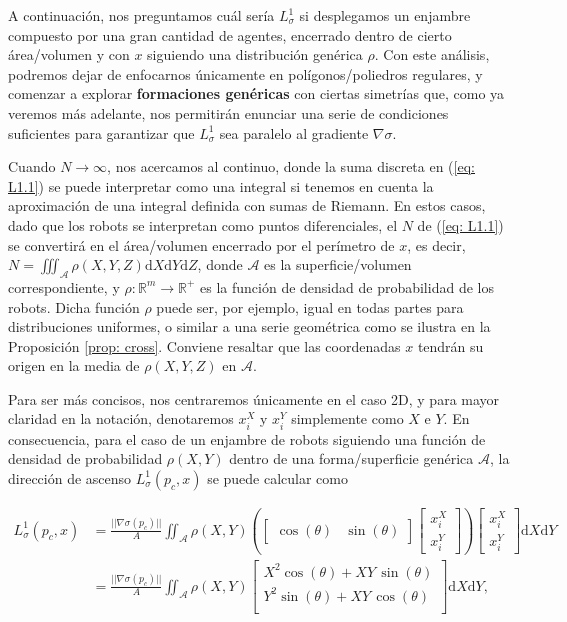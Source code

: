A continuación, nos preguntamos cuál sería $L^1_\sigma$ si desplegamos un enjambre compuesto por una gran cantidad de agentes, encerrado dentro de cierto área/volumen y con $x$ siguiendo una distribución genérica $\rho$. Con este análisis, podremos dejar de enfocarnos únicamente en polígonos/poliedros regulares, y comenzar a explorar \textbf{formaciones genéricas} con ciertas simetrías que, como ya veremos más adelante, nos permitirán enunciar una serie de condiciones suficientes para garantizar que $L^1_\sigma$ sea paralelo al gradiente $\nabla\sigma$. 

Cuando $N\to\infty$, nos acercamos al continuo, donde la suma discreta en (\ref{eq: L1.1}) se puede interpretar como una integral si tenemos en cuenta la aproximación de una integral definida con sumas de Riemann. En estos casos, dado que los robots se interpretan como puntos diferenciales, el $N$ de (\ref{eq: L1.1}) se convertirá en el área/volumen encerrado por el perímetro de $x$, es decir, $N = \iiint_{\mathcal{A}} \rho(X,Y,Z) \mathrm{d}X\mathrm{d}Y\mathrm{d}Z$, donde $\mathcal{A}$ es la superficie/volumen correspondiente, y $\rho: \mathbb{R}^m \to \mathbb{R}^+$ es la función de densidad de probabilidad \cite{mendenhall2012introduction} de los robots. Dicha función $\rho$ puede ser, por ejemplo, igual en todas partes para distribuciones uniformes, o similar a una serie geométrica como se ilustra en la Proposición \ref{prop: cross}. Conviene resaltar que las coordenadas $x$ tendrán su origen en la media de $\rho(X,Y,Z)$ en $\mathcal{A}$.


Para ser más concisos, nos centraremos únicamente en el caso 2D, y para mayor claridad en la notación, denotaremos $x_i^X$ y $x_i^Y$ simplemente como $X$ e $Y$. En consecuencia, para el caso de un enjambre de robots siguiendo una función de densidad de probabilidad $\rho(X,Y)$ dentro de una forma/superficie genérica $\mathcal{A}$, la dirección de ascenso $L_\sigma^1(p_c, x)$ se puede calcular como

\begin{align} 
    L_\sigma^1(p_c, x)  & = 
    \frac{||\nabla\sigma(p_c)||}{A}  \iint_\mathcal{A} \rho(X,Y) \left(
    \begin{bmatrix}\cos(\theta) & \sin(\theta) \end{bmatrix} 
    \begin{bmatrix}x_i^X \\ x_i^Y \end{bmatrix}
    \right)
    \begin{bmatrix}x_i^X \\ x_i^Y \end{bmatrix} 
    \mathrm{d}X \mathrm{d}Y
    \nonumber \\
    & = \frac{||\nabla\sigma(p_c)||}{A} \iint_\mathcal{A}  \rho(X,Y)  \begin{bmatrix}
        X^2 \cos(\theta) + XY\, \sin(\theta) \\
        Y^2 \sin(\theta) + XY\, \cos(\theta) \\
    \end{bmatrix}
    \mathrm{d}X \mathrm{d}Y, \nonumber
\end{align}

